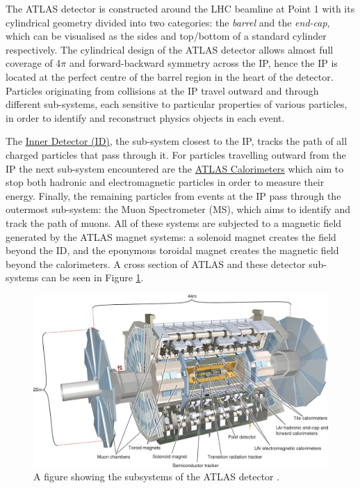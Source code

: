 \documentclass[12pt,a4paper,epsf,portrait,times,epsfig]{article}
\begin{document}
		The ATLAS detector is constructed around the LHC beamline at Point 1 with its cylindrical geometry divided into two categories: the \textit{barrel} and the \textit{end-cap}, which can be visualised as the sides and top/bottom of a standard cylinder respectively. The cylindrical design of the ATLAS detector allows almost full coverage of 4$\pi$ and forward-backward symmetry across the IP, hence the IP is located at the perfect centre of the barrel region in the heart of the detector. Particles originating from collisions at the IP travel outward and through different sub-systems, each sensitive to particular properties of various particles, in order to identify and reconstruct physics objects in each event. \par 


		The \hyperref[Section:InnerDetector]{Inner Detector (ID)}, the sub-system closest to the IP, tracks the path of all charged particles that pass through it. For particles travelling outward from the IP the next sub-system encountered are the \hyperref[Section:Calorimeters]{ATLAS Calorimeters} which aim to stop both hadronic and electromagnetic particles in order to measure their energy. Finally, the remaining particles from events at the IP pass through the outermost sub-system: the Muon Spectrometer (MS), which aims to identify and track the path of muons. All of these systems are subjected to a magnetic field generated by the ATLAS magnet systems: a solenoid magnet creates the field beyond the ID, and the eponymous toroidal magnet creates the magnetic field beyond the calorimeters. A cross section of ATLAS and these detector sub-systems can be seen in Figure \ref{Fig:ATLASDetector}.

		\begin{figure}
			\centering
			\includegraphics{ATLAS}
			\caption{A figure showing the subsystems of the ATLAS detector \cite{Article:ATLASDesignPaper}.}
			\label{Fig:ATLASDetector}
		\end{figure}
\end{document}
